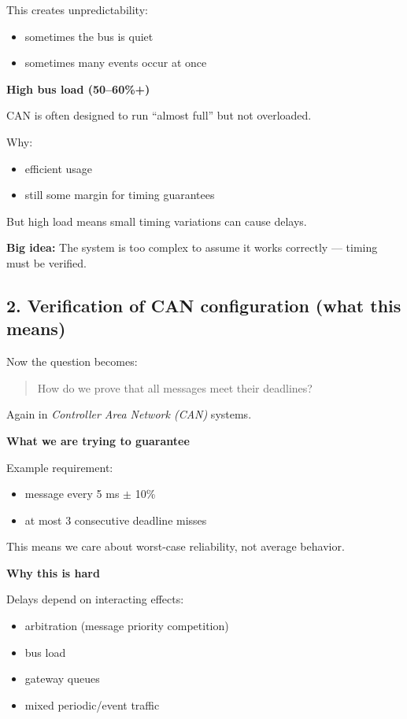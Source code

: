 This creates unpredictability:
\begin{itemize}
\item sometimes the bus is quiet
\item sometimes many events occur at once
\end{itemize}

\textbf{High bus load (50--60\%+)}

CAN is often designed to run ``almost full'' but not overloaded.

Why:
\begin{itemize}
\item efficient usage
\item still some margin for timing guarantees
\end{itemize}

But high load means small timing variations can cause delays.
\begin{mdframed}[backgroundcolor=lightgray, linewidth=0pt, innertopmargin=8pt,
innerbottommargin=8pt]
\textbf{Big idea:}
The system is too complex to assume it works correctly — timing must be verified.
\end{mdframed}
\subsection*{2. Verification of CAN configuration (what this means)}

Now the question becomes:

\begin{quote}
How do we prove that all messages meet their deadlines?
\end{quote}

Again in \textit{Controller Area Network (CAN)} systems.

\textbf{What we are trying to guarantee}

Example requirement:
\begin{itemize}
\item message every 5 ms $\pm$ 10\%
\item at most 3 consecutive deadline misses
\end{itemize}

This means we care about worst-case reliability, not average behavior.

\textbf{Why this is hard}

Delays depend on interacting effects:
\begin{itemize}
\item arbitration (message priority competition)
\item bus load
\item gateway queues
\item mixed periodic/event traffic
\end{itemize}

